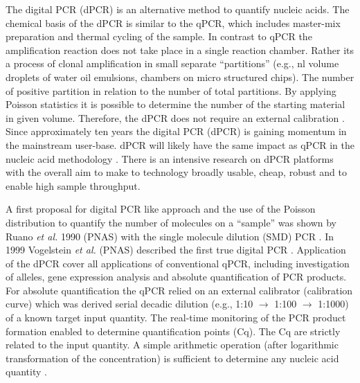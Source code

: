 \documentclass[a4,center,fleqn]{NAR}
\begin{document}
The digital PCR (dPCR) is an alternative method to quantify nucleic acids. The 
chemical basis of the dPCR is similar to the qPCR, which includes master-mix 
preparation and thermal cycling of the sample. In contrast to qPCR the 
amplification reaction does not take place in a single reaction chamber. Rather 
its a process of clonal amplification in small separate ``partitions'' (e.g., nl 
volume droplets of water oil emulsions, chambers on micro structured chips). The 
number of positive partition in relation to the number of total partitions. By 
applying Poisson statistics it is possible to determine the number of the 
starting material in given volume. Therefore, the dPCR does not require an 
external calibration \cite{selck_increased_2013, rodiger_r_2015}. Since 
approximately ten years the digital PCR (dPCR) is gaining momentum in the 
mainstream user-base. dPCR will likely have the same impact as qPCR in the 
nucleic acid methodology \cite{huggett_qpcr_2015, morley_digital_2014, 
rodiger_r_2015}. There is an intensive research on dPCR platforms with the 
overall aim to make to technology broadly usable, cheap, robust and to enable 
high sample throughput.

\enlargethispage{-65.1pt}

A first proposal for digital PCR like approach and the use of the Poisson 
distribution to quantify the number of molecules on a ``sample'' was shown by 
Ruano \textit{et al.} 1990 (PNAS) with the single molecule dilution (SMD) PCR \cite{ruano_haplotype_1990}. In 1999 
Vogelstein \textit{et al.} (PNAS) described the first true digital PCR \cite{vogelstein_digital_1999}. Application of 
the dPCR cover all applications of conventional qPCR, including investigation of 
alleles, gene expression analysis and absolute quantification of PCR products. 
For absolute quantification the qPCR relied on an external calibrator 
(calibration curve) which was derived serial decadic dilution (e.g., 1:10 $\rightarrow$ 
1:100 $\rightarrow$ 1:1000) of a known target input quantity. The real-time monitoring of 
the PCR product formation enabled to determine quantification points (Cq). The 
Cq are strictly related to the input quantity. A simple arithmetic operation 
(after logarithmic transformation of the concentration) is sufficient to 
determine any nucleic acid quantity \cite{huggett_considerations_2014}.
\end{document}
